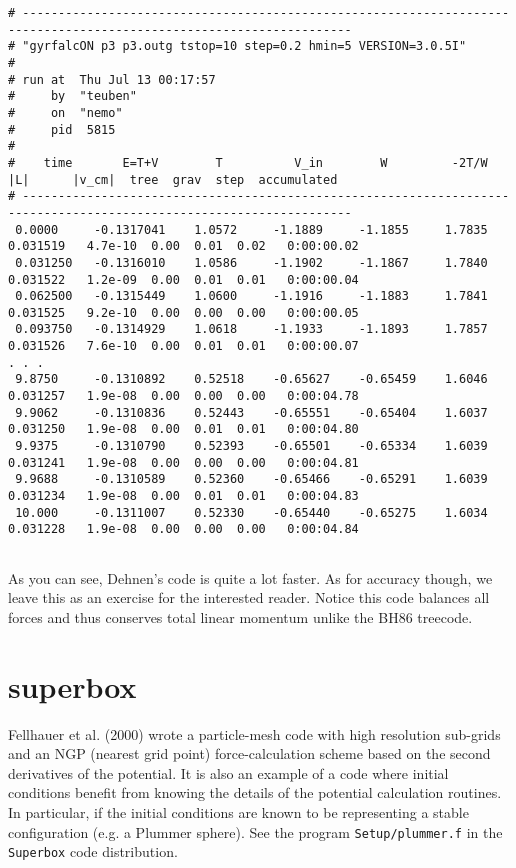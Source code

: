 {\footnotesize\begin{verbatim}
# --------------------------------------------------------------------------------------------------------------------
# "gyrfalcON p3 p3.outg tstop=10 step=0.2 hmin=5 VERSION=3.0.5I"
#
# run at  Thu Jul 13 00:17:57
#     by  "teuben"
#     on  "nemo"
#     pid  5815
#
#    time       E=T+V        T          V_in        W         -2T/W     |L|      |v_cm|  tree  grav  step  accumulated
# --------------------------------------------------------------------------------------------------------------------
 0.0000     -0.1317041    1.0572     -1.1889     -1.1855     1.7835  0.031519   4.7e-10  0.00  0.01  0.02   0:00:00.02
 0.031250   -0.1316010    1.0586     -1.1902     -1.1867     1.7840  0.031522   1.2e-09  0.00  0.01  0.01   0:00:00.04
 0.062500   -0.1315449    1.0600     -1.1916     -1.1883     1.7841  0.031525   9.2e-10  0.00  0.00  0.00   0:00:00.05
 0.093750   -0.1314929    1.0618     -1.1933     -1.1893     1.7857  0.031526   7.6e-10  0.00  0.01  0.01   0:00:00.07
. . . 
 9.8750     -0.1310892    0.52518    -0.65627    -0.65459    1.6046  0.031257   1.9e-08  0.00  0.00  0.00   0:00:04.78
 9.9062     -0.1310836    0.52443    -0.65551    -0.65404    1.6037  0.031250   1.9e-08  0.00  0.01  0.01   0:00:04.80
 9.9375     -0.1310790    0.52393    -0.65501    -0.65334    1.6039  0.031241   1.9e-08  0.00  0.00  0.00   0:00:04.81
 9.9688     -0.1310589    0.52360    -0.65466    -0.65291    1.6039  0.031234   1.9e-08  0.00  0.01  0.01   0:00:04.83
 10.000     -0.1311007    0.52330    -0.65440    -0.65275    1.6034  0.031228   1.9e-08  0.00  0.00  0.00   0:00:04.84


\end{verbatim}\normalsize

As you can see, Dehnen's code is quite a lot faster. As for accuracy though, we leave
this as an exercise for the interested reader. Notice this code balances all forces
and thus conserves total linear momentum unlike the BH86 treecode.

\section{superbox}

Fellhauer et al. (2000) wrote a particle-mesh code with high resolution
sub-grids and an NGP (nearest grid point) force-calculation scheme
based on the second derivatives of the potential.  It is also an example of 
a code where initial conditions benefit from knowing the details of the
potential calculation routines. In particular, if the initial conditions
are known to be representing a stable configuration (e.g. a Plummer sphere).
See the program {\tt Setup/plummer.f} in the {\tt Superbox} code distribution.

}
